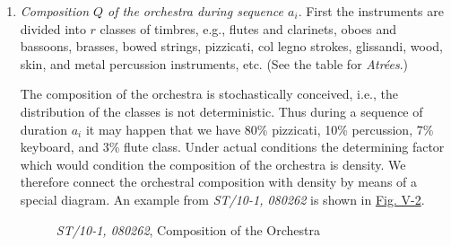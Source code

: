 \documentclass[letterpaper, 11pt]{article}
\begin{document}
\begin{enumerate}
        Let \(a_{i-1}\) be a sequence of duration \(a_{i-1}\), \((\mathrm{DA})_{i-1}\) its density, and \(a_i\) the next sequence with duration \(a_i\) and density \((\mathrm{DA})_i\).
        Density \((\mathrm{DA})_i\) will be given by the formula:
        \[(\mathrm{DA})_i = (\mathrm{DA})_{i-1} \mathrm{e}^{\pm x}\textrm{,}\]
        in which \(x\) is a segment of line drawn at random from a line segment \(s\) of length equal to \((R - 0)\).
        The probability of \(x\) is given by
        \[P_x = \frac{2}{s} \left(1 - \frac{x}{s}\right) \, \mathrm{d}x \tag{See Appendix I.}\]
        and finally,
        \[N_{a_i} = (\mathrm{DA})_i a_i.\]
    \item 
        \textit{Composition \(Q\) of the orchestra during sequence \(a_i\)}.
        First the instruments are divided into \(r\) classes of timbres, e.g., flutes and clarinets, oboes and bassoons, brasses, bowed strings, pizzicati, col legno strokes, glissandi, wood, skin, and metal percussion instruments, etc. (See the table for \textit{Atrées}.)
        \begin{table}[htb]
            \centering
            \caption{
                Composition of the Orchestra for \textit{Atrées} (ST/10-3,060962) \\
                Timbre classes and instruments as on present input data}
            
        \end{table}
        The composition of the orchestra is stochastically conceived, i.e., the distribution of the classes is not deterministic.
        Thus during a sequence of duration \(a_i\) it may happen that we have 80\% pizzicati, 10\% percussion, 7\% keyboard, and 3\% flute class.
        Under actual conditions the determining factor which would condition the composition of the orchestra is density.
        We therefore connect the orchestral composition with density by means of a special diagram.
        An example from \textit{ST/10-1, 080262} is shown in \hyperref[fig:composition]{Fig. V-2}.

        \begin{figure}[htb]
            \centering
            
            \caption{\textit{ST/10-1, 080262}, Composition of the Orchestra}
            \label{fig:composition}
        \end{figure}


\end{enumerate}
\end{document}
